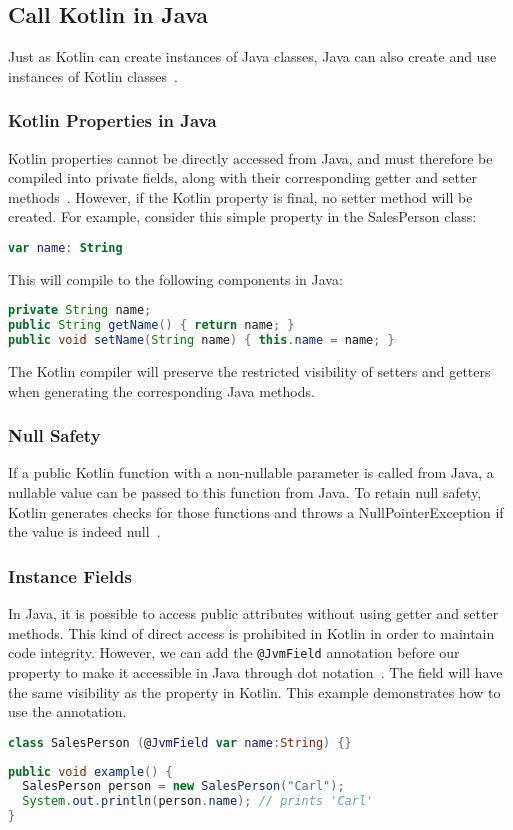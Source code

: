 \documentclass[a4paper,11pt]{article}
\begin{document}
\subsection{Call Kotlin in Java}
Just as Kotlin can create instances of Java classes, Java can also create and use instances of Kotlin classes~\cite{interop-java}.

\subsubsection{Kotlin Properties in Java}
Kotlin properties cannot be directly accessed from Java, and must therefore be compiled into private fields, along with their corresponding getter and setter methods~\cite{interop-properties}. However, if the Kotlin property is final, no setter method will be created. For example, consider this simple property in the SalesPerson class:
\begin{lstlisting}[language=Kotlin]
var name: String
\end{lstlisting}
This will compile to the following components in Java:
\begin{lstlisting}[language=Java]
private String name;
public String getName() { return name; }
public void setName(String name) { this.name = name; }
\end{lstlisting}
The Kotlin compiler will preserve the restricted visibility of setters and getters when generating the corresponding Java methods.

\subsubsection{Null Safety} %
If a public Kotlin function with a non-nullable parameter is called from Java, a nullable value can be passed to this function from Java. To retain null safety, Kotlin generates checks for those functions and throws a NullPointerException if the value is indeed null~\cite{interop-java-null-safety}.

\subsubsection{Instance Fields}
In Java, it is possible to access public attributes without using getter and setter methods. This kind of direct access is prohibited in Kotlin in order to maintain code integrity. However, we can add the \texttt{@JvmField} annotation before our property to make it accessible in Java through dot notation~\cite{interop-instance-fields}. The field will have the same visibility as the property in Kotlin.
This example demonstrates how to use the annotation.
\begin{lstlisting}[language=Kotlin]
class SalesPerson (@JvmField var name:String) {}
\end{lstlisting}
\begin{lstlisting}[language=Java]
public void example() {
  SalesPerson person = new SalesPerson("Carl");
  System.out.println(person.name); // prints 'Carl'
}
\end{lstlisting}
\end{document}

